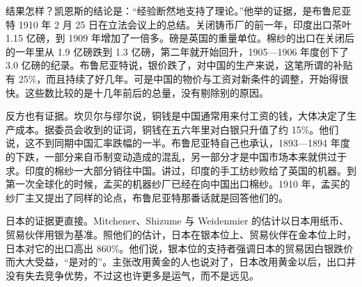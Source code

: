 结果怎样？凯恩斯的结论是：“经验断然地支持了理论。”\cite{keynes1913}他举的证据，是布鲁尼亚特 1910 年 2 月 25 日在立法会议上的总结\cite{keynes1913}。关闭铸币厂的前一年，印度出口茶叶 1.15 亿磅，到 1909 年增加了一倍多\cite{keynes1913}。磅是英国的重量单位。棉纱的出口在关闭后的一年里从 1.9 亿磅跌到 1.3 亿磅，第二年就开始回升，1905—1906 年度创下了 3.0 亿磅的纪录\cite{keynes1913}。布鲁尼亚特说，银价跌了，对中国的生产来说，这笔所谓的补贴有 25\%，而且持续了好几年。可是中国的物价与工资对新条件的调整，开始得很快\cite{keynes1913}。这些数比较的是十几年前后的总量，没有剔除别的原因。

反方也有证据。坎贝尔与缪尔说，铜钱是中国通常用来付工资的钱，大体决定了生产成本\cite{fowler1899}。据委员会收到的证词，铜钱在五六年里对白银只升值了约 15\%\cite{fowler1899}。他们说，这不到同期中国汇率跌幅的一半\cite{fowler1899}。布鲁尼亚特自己也承认，1893—1894 年度的下跌，一部分来自币制变动造成的混乱，另一部分才是中国市场本来就供过于求\cite{keynes1913}。印度的棉纱一大部分销往中国。讲过，印度的手工纺纱败给了英国的机器。到第一次全球化的时候，孟买的机器纱厂已经在向中国出口棉纱。1910 年，孟买的纱厂主又提出了同样的论点，布鲁尼亚特那番话就是回答他们的\cite{keynes1913}。

日本的证据更直接。Mitchener、Shizume 与 Weidenmier 的估计以日本用纸币、贸易伙伴用银为基准。照他们的估计，日本在银本位上、贸易伙伴在金本位上时，日本对它的出口高出 860\%\cite{mitchener2009}。他们说，银本位的支持者强调日本的贸易因白银跌价而大大受益，“是对的”\cite{mitchener2009}。主张改用黄金的人也说对了，日本改用黄金以后，出口并没有失去竞争优势，不过这也许更多是运气，而不是远见\cite{mitchener2009}。

